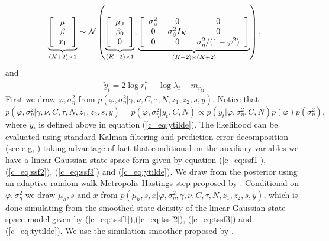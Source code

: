 \documentclass[12pt]{article}
\begin{document}
\begin{equation}
\underbrace{\left[ 
\begin{tabular}{c}
$\mu$ \\
$\beta$ \\
$x_{1}$  
\end{tabular}
\right]}_{(K+2)\times 1} \sim \mathcal{N} \left( \underbrace{\left[ 
\begin{tabular}{c}
$\mu_{0}$ \\
$\beta_{0}$ \\
0
\end{tabular}
\right]}_{(K+2)\times 1} ,\underbrace{\left[ 
\begin{tabular}{ccc}
$\sigma^{2}_{\mu}$ & 0& 0 \\
0&$\sigma^{2}_{\beta} I_{K}$ &  0 \\
0& 0& $\sigma^{2}_{\eta}/(1-\varphi^2)$
\end{tabular}
\right]}_{(K+2)\times (K+2)}  \right)  ,\label{c_eq:tssf3}
\end{equation}
and 
\begin{eqnarray}
\tilde{y}_t = 
2 \log r^{*}_{t}  - \log \lambda_t- m_{ r_{t1}}
\label{c_eq:tytilde}
\end{eqnarray}
First we draw $\varphi, \sigma^{2}_{\eta}$ from $p(\varphi,\sigma^{2}_{\eta}  | \gamma, \nu, C , \tau, N,z_1 , z_2,s ,y)$. Notice that 
\begin{equation}
p(\varphi,\sigma^{2}_{\eta} | \gamma, \nu, C , \tau, N,z_1 , z_2,s ,y)=p(\varphi,\sigma^{2}_{\eta} | \tilde{y}_t, C, N) \propto p(\tilde{y}_t | \varphi,\sigma^{2}_{\eta},C, N) p( \varphi)p(\sigma^{2}_{\eta}),
\end{equation}
where $\tilde{y}_t$ is defined above in equation (\ref{c_eq:ytilde}). The likelihood can be evaluated using standard Kalman filtering and prediction error decomposition (see e.g, \citet{DurbinKoopman2012}) taking advantage of fact that conditional on the auxiliary variables we have a linear Gaussian state space form given by equation (\ref{c_eq:ssf1}),(\ref{c_eq:ssf2}), (\ref{c_eq:ssf3}) and (\ref{c_eq:ytilde}). We draw from the posterior using an adaptive random walk Metropolis-Hastings step proposed by \citet{RobertsRosenthal2009}. 
Conditional on  $\varphi,\sigma^{2}_{\eta} $ we draw $\mu_{h},s$ and $x$ from $p(\mu_{h},s ,x| \varphi,\sigma^{2}_{\eta} ,\gamma, \nu, C, \tau, N,z_1 , z_2,s ,y)$, which is done simulating from the smoothed state density of the linear Gaussian state space model  given by  (\ref{c_eq:tssf1}),(\ref{c_eq:tssf2}), (\ref{c_eq:tssf3}) and (\ref{c_eq:tytilde}). We use the simulation smoother proposed by \citet{DurbinKoopman2002}.
\end{document}
